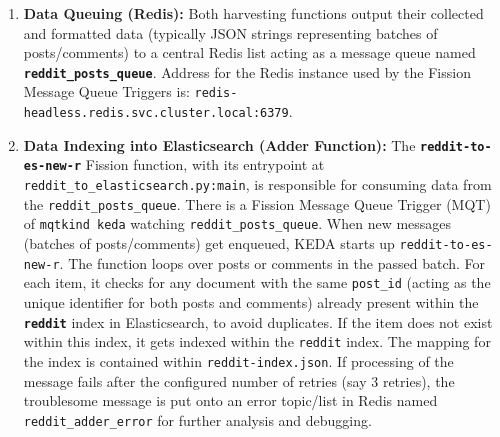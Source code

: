 \documentclass[]{article}
\numberwithin{equation}{section}
\begin{document}
\begin{enumerate}
\begin{itemize}
        \item \textbf{Timer Triggered Daily Harvester (\texttt{reddit-daily-job}):}
            This function is automatically executed once a day, triggered by a Fission timer configured with a \texttt{@daily} cron schedule.
            It initiates the \texttt{reddit\_daily\_harvester.py:main} entrypoint.
            The script searches for posts through the Reddit API by referencing a hardcoded list of subreddits (\texttt{DAILY\_SUBREDDITS}) and keywords (\texttt{DAILY\_KEYWORDS}) within the script.   
            It focuses on posts created within a specific recent period defined by \texttt{DAILY\_SCRAPE\_DAYS\_AGO} (e.g., 1 day by default, but configurable as per the script's constants). The constants \texttt{DAILY\_LIMIT\_PER\_KEYWORD\_SUBREDDIT} and \texttt{DAILY\_SORT\_METHOD} are also mutable.
            It operates in a manner similar to the HTTP harvester, retrieving posts (and possibly their top-level comments via \texttt{get\_post\_comments\_for\_daily}) (depending on some configuration there). The JSON-formatted data is then sent to the \textbf{\texttt{reddit\_posts\_queue}} using \texttt{util.py:enqueue\_data}.
            Hardcoding these subreddits and keywords in the daily harvester is deliberate, to facilitate daily scraping in an automated fashion; very well might be put into the \texttt{shared-data} ConfigMap for more flexibility. 
    \end{itemize}

    \item \textbf{Data Queuing (Redis):} 
    Both harvesting functions output their collected and formatted data (typically JSON strings representing batches of posts/comments) to a central Redis list acting as a message queue named \textbf{\texttt{reddit\_posts\_queue}}.  
    Address for the Redis instance used by the Fission Message Queue Triggers is: \texttt{redis-headless.redis.svc.cluster.local:6379}.
    

    \item \textbf{Data Indexing into Elasticsearch (Adder Function):}
    The \textbf{\texttt{reddit-to-es-new-r}} Fission function, with its entrypoint at \texttt{reddit\_to\_elasticsearch.py:main}, is responsible for consuming data from the \texttt{reddit\_posts\_queue}.
    There is a Fission Message Queue Trigger (MQT) of \texttt{mqtkind keda} watching \texttt{reddit\_posts\_queue}.
    When new messages (batches of posts/comments) get enqueued, KEDA starts up \texttt{reddit-to-es-new-r}.
    The function loops over posts or comments in the passed batch.
    For each item, it checks for any document with the same \texttt{post\_id} (acting as the unique identifier for both posts and comments) already present within the \textbf{\texttt{reddit}} index in Elasticsearch, to avoid duplicates. 
    If the item does not exist within this index, it gets indexed within the \texttt{reddit} index. The mapping for the index is contained within \texttt{reddit-index.json}.
    If processing of the message fails after the configured number of retries (say 3 retries), the troublesome message is put onto an error topic/list in Redis named \texttt{reddit\_adder\_error} for further analysis and debugging.
\end{enumerate}
\end{document}
